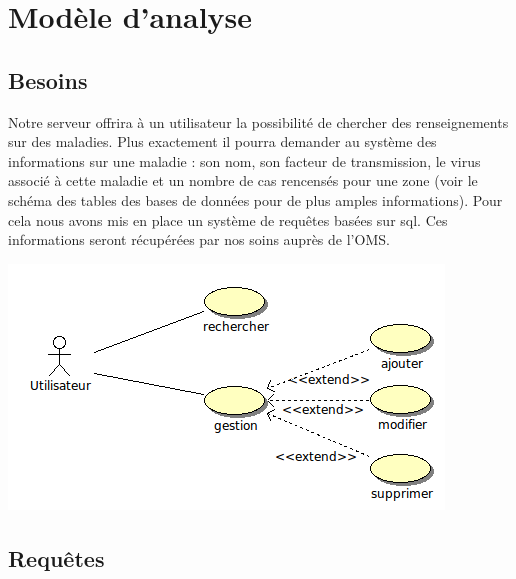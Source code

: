 \documentclass[12pt]{article}
\begin{document}
\newpage

\section{Modèle d'analyse}

\subsection{Besoins}

	Notre serveur offrira à un utilisateur la possibilité de chercher des renseignements sur des maladies. Plus exactement il pourra demander au système des informations sur une maladie : son nom, son facteur de transmission, le virus associé à cette maladie et un nombre de cas rencensés pour une zone (voir le schéma des tables des bases de données pour de plus amples informations). Pour cela nous avons mis en place un système de requêtes basées sur sql. Ces informations seront récupérées par nos soins auprès de l'OMS.\\
	
\begin{center}
	\includegraphics[scale=0.70]{images/SimpleUseCase.png}
\end{center}

\subsection{Requêtes}
\end{document}
